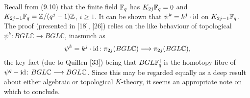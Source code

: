 Recall from (9.10) that the finite field $\mathbb{F}_q$ has $K_{2j}\mathbb{F}_q = 0$ and $K_{2j-1}\mathbb{F}_q = \mathbb{Z}/(q^j-1)\mathbb{Z}$, $i \geqslant 1$.
It can be shown that $\psi^k= k^j\cdot\mathrm{id}$ on $K_{2j-1}\mathbb{F}_q$. The proof (presented in [18], [26]) relies on the
like behaviour of topological $\psi^k \colon BGL\mathbb{C} \longrightarrow BGL\mathbb{C}$, inasmuch as
\[\psi^k = k^j \cdot \mathrm{id} \colon \pi_{2j}(BGL\mathbb{C}) \longrightarrow \pi_{2j}(BGL\mathbb{C}),\]
the key fact (due to Quillen [33]) being that $BGL\mathbb{F}_q^+ $is the homotopy fibre of
$\psi^q-\mathrm{id} \colon BGL\mathbb{C} \longrightarrow BGL\mathbb{C}$. Since this may be regarded equally as a deep result about either algebraic or topological $K$-theory, it seems an appropriate note on which to conclude.
